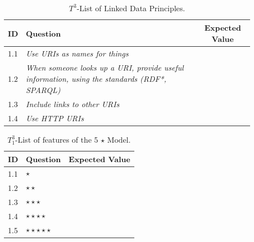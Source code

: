 \begin{table}[t]
\scriptsize
\renewcommand{\arraystretch}{1.3}
\begin{center}
\begin{tabular}[c]{|l|p{5cm}|c|} 
\hline
  \textbf{ID} & \textbf{Question} &  \textbf{Expected Value}  \\\hline
   1.1&\textit{Use URIs as names for things} & \si  \\ \hline
   1.2&\textit{When someone looks up a URI, provide useful information, using the standards (RDF*, SPARQL)} & \si \\ \hline  
   1.3&\textit{Include links to other URIs} & \si \\ \hline    
   1.4&\textit{Use HTTP URIs} & \si \\ \hline    
   \hline
   \end{tabular}
  \caption{$T^{3}$-List of Linked Data Principles.}
  \label{table:validation-t3}
  \end{center}
\end{table} 

\begin{table}[t]
\scriptsize
\renewcommand{\arraystretch}{1.3}
\begin{center}
\begin{tabular}[c]{|l|p{5cm}|c|} 
\hline
  \textbf{ID} & \textbf{Question} &  \textbf{Expected Value}  \\\hline
    1.1&$\star$	& \si \\ \hline 
    1.2&$\star \star$	 & \si \\ \hline 
    1.3&$\star \star \star$	& \si  \\ \hline 
    1.4&$\star \star \star \star$ & \si \\ \hline 
   1.5&$\star \star \star \star \star$ & \si \\ \hline 
   \end{tabular}
   \caption{$T^{3}_1$-List of features of the 5 $\star$ Model.}
   \label{table:validation-t31}
  \end{center}
\end{table} 


